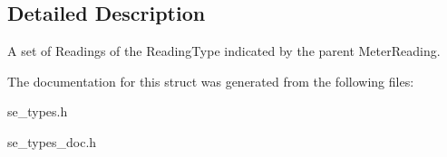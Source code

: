 \subsection{Detailed Description}
A set of Readings of the Reading\+Type indicated by the parent Meter\+Reading. 

The documentation for this struct was generated from the following files\+:\begin{DoxyCompactItemize}
\item 
se\+\_\+types.\+h\item 
se\+\_\+types\+\_\+doc.\+h\end{DoxyCompactItemize}
